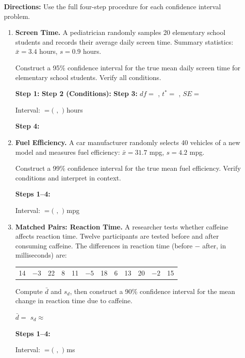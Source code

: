 \documentclass[10pt]{article}
\begin{document}
\namedateperiod

\vspace{0.1in}
\textbf{Directions:} Use the full four-step procedure for each confidence interval problem.

\begin{enumerate}

  \item \textbf{Screen Time.} A pediatrician randomly samples 20 elementary school
        students and records their average daily screen time. Summary statistics:
        $\bar x = 3.4$ hours, $s = 0.9$ hours.

        Construct a 95\% confidence interval for the true mean daily screen time
        for elementary school students. Verify all conditions.
        \vspace{0.1in}

        \textbf{Step 1:} \writeline
        \textbf{Step 2 (Conditions):} 
        \textbf{Step 3:} $df =$ \blank{2cm}, $t^* =$ \blank{2.5cm}, $SE =$ \blank{2.5cm}

        Interval: \blank{8cm} $= ($ \blank{2cm}$,$ \blank{2cm}$)$ hours
        \vspace{0.05in}

        \textbf{Step 4:} 

  \item \textbf{Fuel Efficiency.} A car manufacturer randomly selects 40 vehicles of a
        new model and measures fuel efficiency: $\bar x = 31.7$ mpg, $s = 4.2$ mpg.

        Construct a 99\% confidence interval for the true mean fuel efficiency. Verify
        conditions and interpret in context.
        \vspace{0.1in}

        \textbf{Steps 1--4:} 

        Interval: $= ($ \blank{2cm}$,$ \blank{2cm}$)$ mpg

  \item \textbf{Matched Pairs: Reaction Time.} A researcher tests whether caffeine
        affects reaction time. Twelve participants are tested before and after consuming
        caffeine. The differences in reaction time (before $-$ after, in milliseconds) are:

        \medskip
        \begin{center}
        \begin{tabular}{cccccccccccc}
            14 & $-3$ & 22 & 8 & 11 & $-5$ & 18 & 6 & 13 & 20 & $-2$ & 15
        \end{tabular}
        \end{center}
        \medskip

        Compute $\bar d$ and $s_d$, then construct a 90\% confidence interval for
        the mean change in reaction time due to caffeine.

        $\bar d = $ \blank{3cm} \quad $s_d \approx $ \blank{3cm}

        \textbf{Steps 1--4:} 

        Interval: $= ($ \blank{2cm}$,$ \blank{2cm}$)$ ms

\end{enumerate}
\end{document}
